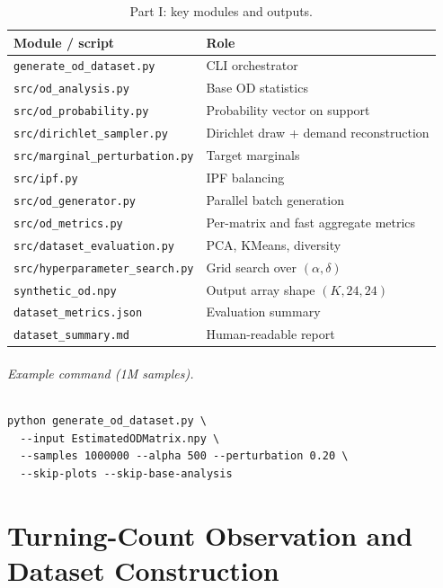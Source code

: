 \documentclass[11pt,a4paper]{report}
\begin{document}
\begin{table}[ht]
\centering
\caption{Part I: key modules and outputs.}
\label{tab:impl1}
\small
\begin{tabular}{@{}ll@{}}
\toprule
\textbf{Module / script} & \textbf{Role} \\
\midrule
\texttt{generate\_od\_dataset.py} & CLI orchestrator \\
\texttt{src/od\_analysis.py} & Base OD statistics \\
\texttt{src/od\_probability.py} & Probability vector on support \\
\texttt{src/dirichlet\_sampler.py} & Dirichlet draw + demand reconstruction \\
\texttt{src/marginal\_perturbation.py} & Target marginals \\
\texttt{src/ipf.py} & IPF balancing \\
\texttt{src/od\_generator.py} & Parallel batch generation \\
\texttt{src/od\_metrics.py} & Per-matrix and fast aggregate metrics \\
\texttt{src/dataset\_evaluation.py} & PCA, KMeans, diversity \\
\texttt{src/hyperparameter\_search.py} & Grid search over $(\alpha,\delta)$ \\
\midrule
\texttt{synthetic\_od.npy} & Output array shape $(K,24,24)$ \\
\texttt{dataset\_metrics.json} & Evaluation summary \\
\texttt{dataset\_summary.md} & Human-readable report \\
\bottomrule
\end{tabular}
\end{table}

\paragraph{Example command (1M samples).}
\begin{verbatim}
python generate_od_dataset.py \
  --input EstimatedODMatrix.npy \
  --samples 1000000 --alpha 500 --perturbation 0.20 \
  --skip-plots --skip-base-analysis
\end{verbatim}


\part{Turning-Count Observation and Dataset Construction}
\label{part:turning}
\end{document}
